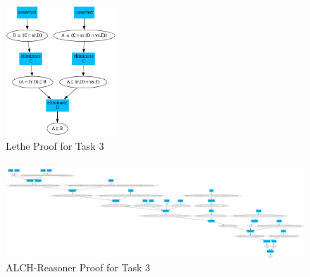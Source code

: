 \documentclass{beamer}
\begin{document}
            \begin{frame}
                \frametitle{}               
                \begin{figure}
                    \centering
                    \includegraphics[width=0.37\textwidth]{pictures/Lehte_task00003.png}
                    \caption{Lethe Proof for Task 3}
                  \end{figure}
             \end{frame}
             
            \begin{frame}
                \frametitle{}
                \begin{figure}
                    \centering
                    \includegraphics[width=1\textwidth]{pictures/ALCH_task00003.png}
                    \caption{ALCH-Reasoner Proof for Task 3}
                  \end{figure}
             \end{frame}
\end{document}
